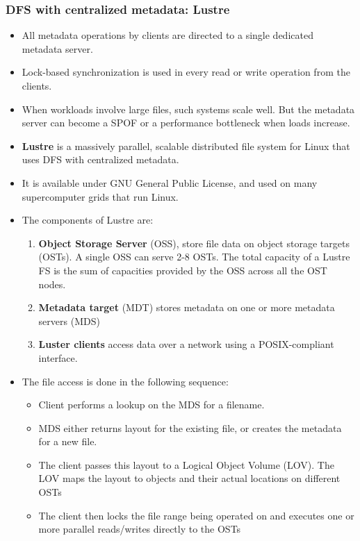 \documentclass{article}
\begin{document}
\subsubsection{DFS with centralized metadata: Lustre}
\begin{itemize}
    \item All metadata operations by clients are directed to a single dedicated metadata server. 
    
    \item Lock-based synchronization is used in every read or write operation from the clients.
    
    \item When workloads involve large files, such systems scale well. But the metadata server can become a SPOF or a performance bottleneck when loads increase. 
    
    \item \textbf{Lustre} is a massively parallel, scalable distributed file system for Linux that uses DFS with centralized metadata. 
    
    \item It is available under GNU General Public License, and used on many supercomputer grids that run Linux. 
    
    \item The components of Lustre are:
    \begin{enumerate}
        \item \textbf{ Object Storage Server} (OSS), store file data on object storage targets (OSTs). A single OSS can serve 2-8 OSTs. The total capacity of a Lustre FS is the sum of capacities provided by the OSS across all the OST nodes. 
        
        \item \textbf{Metadata target} (MDT) stores metadata on one or more metadata servers (MDS)
        
        \item \textbf{Luster clients} access data over a network using a POSIX-compliant interface. 
    \end{enumerate}
    
    \item The file access is done in the following sequence:
    \begin{itemize}
        \item Client performs a lookup on the MDS for a filename. 
        
        \item MDS either returns layout for the existing file, or creates the metadata for a new file. 
        
        \item The client passes this layout to a Logical Object Volume (LOV). The LOV maps the layout to objects and their actual locations on different OSTs
        
        \item The client then locks the file range being operated on and executes one or more parallel reads/writes directly to the OSTs
    \end{itemize}
\end{itemize}
\end{document}
